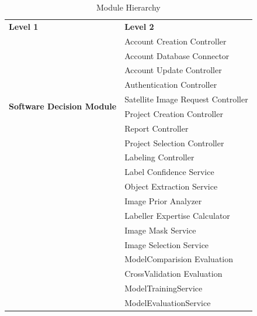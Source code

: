 \documentclass[12pt, titlepage]{article}
\begin{document}
\begin{table}[h!]
  \centering
  \begin{tabular}{p{} p{}}
  \toprule
  \textbf{Level 1} & \textbf{Level 2}\\
  \multirow{10}{0.3\textwidth}{\textbf{Software Decision Module}} 
   & Account Creation Controller\\
   & Account Database Connector\\
   & Account Update Controller\\
   & Authentication Controller\\
   & Satellite Image Request Controller\\
   & Project Creation Controller\\
   & Report Controller\\
   & Project Selection Controller\\
   & Labeling Controller\\
   & Label Confidence Service\\
   & Object Extraction Service\\
   & Image Prior Analyzer\\
   & Labeller Expertise Calculator\\
   & Image Mask Service\\
   & Image Selection Service\\
   & ModelComparision Evaluation\\
   & CrossValidation Evaluation\\
   & ModelTrainingService\\
   & ModelEvaluationService\\
  \bottomrule
  \end{tabular}
  \caption{Module Hierarchy}
  \label{TblMH}
  \end{table}
  

\newpage 

~\newpage 




\end{document}
